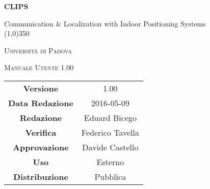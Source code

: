 \documentclass[a4paper,12pt]{article}
\author{Eduard Bicego}
\date{01/05/2016}
\begin{document}
\begin{titlepage}
	\centering
	{\huge\bfseries CLIPS\par}
	Communication \& Localization with Indoor Positioning Systems \\
	\line(1,0){350} \\
	{\scshape\LARGE Università di Padova \par}
	\vspace{1cm}
	{\scshape\Large Manuale Utente 1.00 \par}
	\logo
	\newpage
	\begin{tabular}{c|c}
		{\hfill \textbf{Versione}} 			& 1.00					\\
		{\hfill\textbf{Data Redazione}} 		& 2016-05-09  		\\
		{\hfill\textbf{Redazione}} 			& Eduard Bicego			\\
		{\hfill\textbf{Verifica}} 				&  Federico Tavella					\\
		{\hfill\textbf{Approvazione}} 		& Davide Castello		\\
		{\hfill\textbf{Uso}} 					& Esterno			\\
		{\hfill\textbf{Distribuzione}} 			& Pubblica 		\\
	\end{tabular}
\end{titlepage}


	
	\newpage
	\pagestyle{myfront}
	
		\newpage
			
		\newpage
			\tableofcontents
		\newpage
			\listoffigures
	\label{LastFrontPage}

	\newpage
		\pagestyle{mymain}
	\newpage
		
	\newpage
		
	\newpage
		
	\newpage
		
	\newpage
		
	\newpage
		
	
	
	\newpage
		\printglossary

		
	\label{LastPage}
\end{document}

